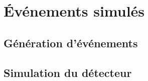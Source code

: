 \section{Événements simulés}

\subsection{Génération d'événements}

\subsection{Simulation du détecteur}
